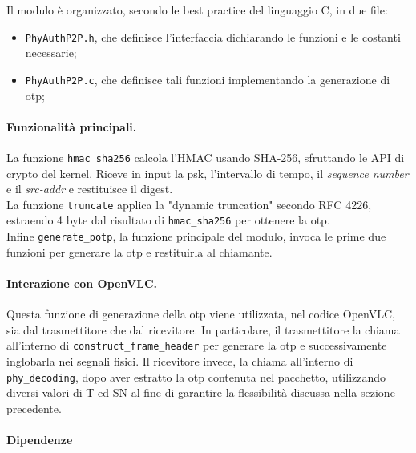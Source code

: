 \noindent Il modulo è organizzato, secondo le best practice del linguaggio C, in due file:
\begin{itemize}
    \item \texttt{PhyAuthP2P.h}, che definisce l'interfaccia dichiarando le funzioni e le costanti necessarie;
    \item \texttt{PhyAuthP2P.c}, che definisce tali funzioni implementando la generazione di \gls{otp};
\end{itemize}


\paragraph{Funzionalità principali.}
La funzione \texttt{hmac\_sha256} calcola l'HMAC usando SHA-256, sfruttando le API di crypto del kernel. Riceve in input la \gls{psk}, l'intervallo di tempo, il \textit{sequence number} e il \textit{src-addr} e restituisce il digest.\\
La funzione \texttt{truncate} applica la "dynamic truncation" secondo RFC 4226, estraendo 4 byte dal risultato di \texttt{hmac\_sha256} per ottenere la \gls{otp}.\\
Infine \texttt{generate\_potp}, la funzione principale del modulo, invoca le prime due funzioni per generare la \gls{otp} e restituirla al chiamante.

\paragraph{Interazione con OpenVLC.}
Questa funzione di generazione della \gls{otp} viene utilizzata, nel codice OpenVLC, sia dal trasmettitore che dal ricevitore.
In particolare, il trasmettitore la chiama all'interno di \texttt{construct\_frame\_header} per generare la \gls{otp} e successivamente inglobarla nei segnali fisici. Il ricevitore invece, la chiama all'interno di \texttt{phy\_decoding}, dopo aver estratto la \gls{otp} contenuta nel pacchetto, utilizzando diversi valori di T ed SN al fine di garantire la flessibilità discussa nella sezione precedente.

\paragraph{Dipendenze}

